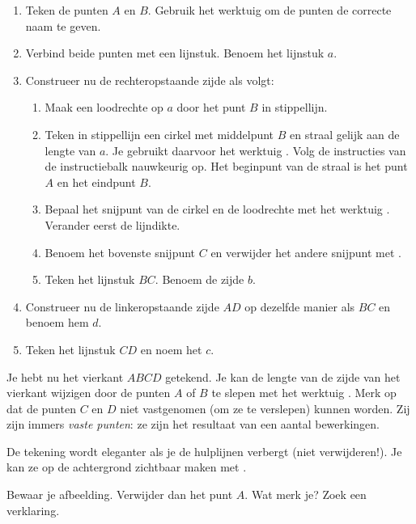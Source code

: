 \begin{enumerate}
\item Teken de punten $A$ en $B$. Gebruik het werktuig  om de punten de correcte naam te geven.
\item Verbind beide punten met een lijnstuk. Benoem het lijnstuk $a$.
\item Construeer nu de rechteropstaande zijde als volgt:
\begin{enumerate}
\item Maak een loodrechte op $a$ door het punt $B$ in stippellijn.
\item Teken in stippellijn een cirkel met middelpunt $B$ en straal gelijk aan de lengte van $a$. Je gebruikt daarvoor het werktuig . Volg de instructies van de instructiebalk nauwkeurig op. Het beginpunt van de straal is het punt $A$ en het eindpunt $B$.
\item Bepaal het snijpunt van de cirkel en de loodrechte met het werktuig . Verander eerst de lijndikte.
\item Benoem het bovenste snijpunt $C$ en verwijder het andere snijpunt met .
\item Teken het lijnstuk $BC$. Benoem de zijde $b$.
\end{enumerate}
\item Construeer nu de linkeropstaande zijde $AD$ op dezelfde manier als $BC$ en benoem hem $d$.
\item Teken het lijnstuk $CD$ en noem het $c$.
\end{enumerate}

Je hebt nu het vierkant $ABCD$ getekend. Je kan de lengte van de zijde van het vierkant wijzigen door de punten $A$ of $B$ te slepen met het werktuig . Merk op dat de punten $C$ en $D$ niet vastgenomen (om ze te verslepen) kunnen worden. Zij zijn immers {\it vaste punten}: ze zijn het resultaat van een aantal bewerkingen.

De tekening wordt eleganter als je de hulplijnen verbergt (niet verwijderen!). Je kan ze op de achtergrond zichtbaar maken met .

Bewaar je afbeelding. Verwijder dan het punt $A$. Wat merk je? Zoek een verklaring.

